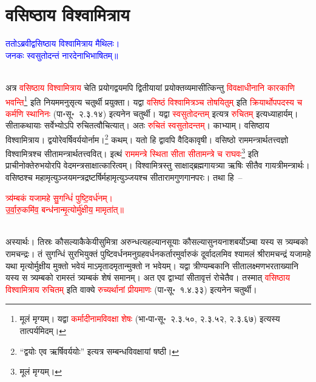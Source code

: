 \section[वसिष्ठाय विश्वामित्राय]{वसिष्ठाय विश्वामित्राय}
\centering\textcolor{blue}{ततोऽब्रवीद्वसिष्ठाय विश्वामित्राय मैथिलः।\nopagebreak\\
जनकः स्वसुतोदन्तं नारदेनाभिभाषितम्॥}\nopagebreak\\
\\
\begin{sloppypar}\justifying\noindent\hspace{10mm} अत्र \textcolor{red}{वसिष्ठाय विश्वामित्राय} चेति प्रयोगद्वयमपि द्वितीयायां प्रयोक्तव्यमासीत्किन्तु \textcolor{red}{विवक्षाधीनानि कारकाणि भवन्ति}\footnote{मूलं मृग्यम्। यद्वा \textcolor{red}{कर्मादीनामविवक्षा शेषः} (भा॰पा॰सू॰~२.३.५०, २.३.५२, २.३.६७) इत्यस्य तात्पर्यमिदम्।} इति नियममनुसृत्य चतुर्थी प्रयुक्ता। यद्वा \textcolor{red}{वसिष्ठं विश्वामित्रञ्च तोषयितुम्‌} इति \textcolor{red}{क्रियार्थोपपदस्य च कर्मणि स्थानिनः} (पा॰सू॰~२.३.१४) इत्यनेन चतुर्थी। यद्वा \textcolor{red}{स्व\-सुतोदन्तम्‌} इत्यत्र \textcolor{red}{रुचितम्‌} इत्यध्याहार्यम्। सीता\-कथायाः सर्वेभ्योऽपि रुचितत्वौचित्यात्। अतः \textcolor{red}{रुचितं स्व\-सुतोदन्तम्‌}। काभ्याम्। वसिष्ठाय विश्वामित्राय। द्वयोरेवर्षिवर्ययोर्नाम।\footnote{“द्वयोः एव ऋर्षिवर्ययोः” इत्यत्र सम्बन्ध\-विवक्षायां षष्ठी।} कथम्। यतो हि द्वावपि वैदिकावृषी। वसिष्ठो राम\-मन्त्रार्थ\-तत्त्वज्ञो विश्वामित्रश्च सीता\-मन्त्रार्थ\-तत्त्ववित्। इत्थं \textcolor{red}{राममन्त्रे स्थिता सीता सीतामन्त्रे च राघवः}\footnote{मूलं मृग्यम्।} इति प्राचीनोक्तेरुभयोरपि वेद\-मन्त्र\-साक्षात्\-कारित्वम्। विश्वामित्रस्तु साक्षाद्ब्रह्म\-गायत्र्या ऋषिः सीतैव गायत्री\-मन्त्रार्थः। वसिष्ठश्च महा\-मृत्युञ्जय\-मन्त्र\-द्रष्टर्षिर्महा\-मृत्युञ्जयश्च सीताराम\-गुण\-गान\-परः। तथा हि~–\end{sloppypar}
\centering\textcolor{red}{त्र्य॑म्बकं यजामहे सु॒गन्धिं॑ पुष्टि॒वर्ध॑नम्।\nopagebreak\\
उ॒र्वा॒रु॒कमि॑व॒ बन्ध॑नान्मृ॒त्योर्मु॑क्षीय॒ मामृता॑त्॥}\nopagebreak\\
\\
\begin{sloppypar}\justifying\noindent अस्यार्थः। तिस्रः कौसल्या\-कैकेयी\-सुमित्रा अरुन्धत्यहल्यानसूयाः कौसल्या\-सुनयना\-शबर्योऽम्बा यस्य स त्र्यम्बको रामचन्द्रः। तं सुगन्धिं सुरभि\-युक्तं पुष्टिवर्धनमनुग्रह\-वर्धन\-कर्तारमुर्वारुकं दूर्वादलमिव श्यामलं श्रीरामचन्द्रं यजामहे यथा मृत्योर्मुक्षीय मुक्तो भवेयं माऽमृतादमृतान्मुक्तो न भवेयम्। यद्वा त्रीण्यम्बकानि सीता\-लक्ष्मण\-भरताख्यानि यस्य स त्र्यम्बको रामस्तं त्र्यम्बकं शेषं समानम्। अत एव द्वाभ्यां सीता\-वृत्तं रोचेतैव। तस्मात् \textcolor{red}{वसिष्ठाय विश्वामित्राय रुचितम्‌} इति वाक्ये \textcolor{red}{रुच्यर्थानां प्रीयमाणः} (पा॰सू॰~१.४.३३) इत्यनेन चतुर्थी।\end{sloppypar}
